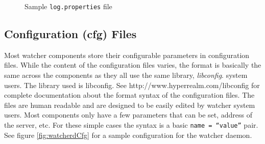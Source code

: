 \documentclass{article}
\begin{document}
\begin{figure}[htb]
\caption{Sample {\tt log.properties} file}
\label{fig:logPropsFile}
\end{figure}

\subsection{Configuration (cfg) Files} 
Most watcher components store their configurable parameters in configuration files. While the content of the configuration files varies, the format is 
basically the same across the components as they all use the same library, {\it libconfig}.  system users. The library used is libconfig. 
See http://www.hyperrealm.com/libconfig for complete documentation about the format syntax of the configuration 
files.  The files are human readable and are designed to be easily edited by watcher system users. Most components only have a few parameters that
can be set, address of the server, etc. For these simple cases the syntax is a basic {\tt name = ``value''} pair. See figure \ref{fig:watcherdCfg} for a
sample configuration for the watcher daemon. 
\end{document}
